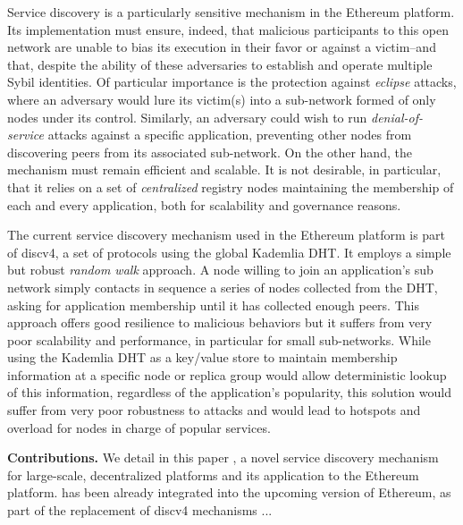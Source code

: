 Service discovery is a particularly sensitive mechanism in the Ethereum platform.
Its implementation must ensure, indeed, that malicious participants to this open network are unable to bias its execution in their favor or against a victim--and that, despite the ability of these adversaries to establish and operate multiple Sybil identities.
Of particular importance is the protection against \emph{eclipse} attacks, where an adversary would lure its victim(s) into a sub-network formed of only nodes under its control. %
Similarly, an adversary could wish to run \emph{denial-of-service} attacks against a specific application, preventing other nodes from discovering peers from its associated sub-network.
On the other hand, the mechanism must remain efficient and scalable.
It is not desirable, in particular, that it relies on a set of \emph{centralized} registry nodes maintaining the membership of each and every application, both for scalability and governance reasons.

The current service discovery mechanism used in the Ethereum platform is part of discv4, a set of protocols using the global Kademlia DHT.
It employs a simple but robust \emph{random walk} approach.
A node willing to join an application's sub network simply contacts in sequence a series of nodes collected from the DHT, asking for application membership until it has collected enough peers. %
This approach offers good resilience to malicious behaviors
but it suffers from very poor scalability and performance, in particular for small sub-networks.
While using the Kademlia DHT as a key/value store to maintain membership information at a specific node or replica group would allow deterministic lookup of this information, regardless of the application's popularity, this solution would suffer from very poor robustness to attacks and would lead to hotspots and overload for nodes in charge of popular services.

\smallskip
\noindent
\textbf{Contributions.}
%
We detail in this paper \sysname, a novel service discovery mechanism for large-scale, decentralized platforms and its application to the Ethereum platform.
\sysname has been already integrated into the upcoming version of Ethereum, as part of the replacement of discv4 mechanisms ... 

